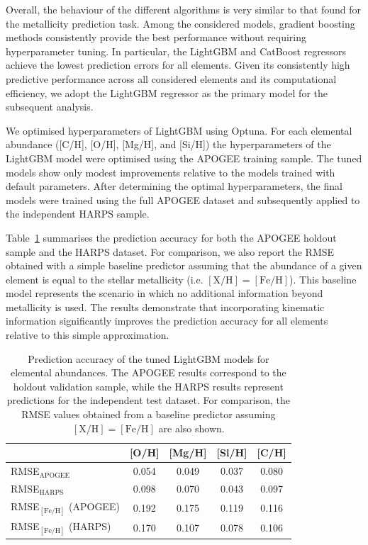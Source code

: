 \documentclass{aa}
\begin{document}
Overall, the behaviour of the different algorithms is very similar to that found for the metallicity prediction task. Among the considered models, gradient boosting methods consistently provide the best performance without requiring hyperparameter tuning. In particular, the LightGBM and CatBoost regressors achieve the lowest prediction errors for all elements. Given its consistently high predictive performance across all considered elements and its computational efficiency, we adopt the LightGBM regressor as the primary model for the subsequent analysis.

We optimised hyperparameters of LightGBM using Optuna. For each elemental abundance ([C/H], [O/H], [Mg/H], and [Si/H]) the hyperparameters of the LightGBM model were optimised using the APOGEE training sample. The tuned models show only modest improvements relative to the models trained with default parameters. After determining the optimal hyperparameters, the final models were trained using the full APOGEE dataset and subsequently applied to the independent HARPS sample.

Table~\ref{tab:abundance_predictions} summarises the prediction accuracy for both the APOGEE holdout sample and the HARPS dataset. For comparison, we also report the RMSE obtained with a simple baseline predictor assuming that the abundance of a given element is equal to the stellar metallicity (i.e. $\mathrm{[X/H]} = \mathrm{[Fe/H]}$). This baseline model represents the scenario in which no additional information beyond metallicity is used. The results demonstrate that incorporating kinematic information significantly improves the prediction accuracy for all elements relative to this simple approximation.

\begin{table}
\caption{Prediction accuracy of the tuned LightGBM models for elemental abundances.
The APOGEE results correspond to the holdout validation sample, while the HARPS
results represent predictions for the independent test dataset. For comparison,
the RMSE values obtained from a baseline predictor assuming
$\mathrm{[X/H]}=\mathrm{[Fe/H]}$ are also shown.}
\centering
\begin{tabular}{lcccc}
\hline
 & [O/H] & [Mg/H] & [Si/H] & [C/H] \\
\hline
RMSE$_{\mathrm{APOGEE}}$ & 0.054 & 0.049 & 0.037 & 0.080 \\
RMSE$_{\mathrm{HARPS}}$  & 0.098 & 0.070 & 0.043 & 0.097 \\
\hline
RMSE$_{\mathrm{[Fe/H]}}$ (APOGEE) & 0.192 & 0.175 & 0.119 & 0.116 \\
RMSE$_{\mathrm{[Fe/H]}}$ (HARPS)  & 0.170 & 0.107 & 0.078 & 0.106 \\
\hline
\end{tabular}
\label{tab:abundance_predictions}
\end{table}
\end{document}
